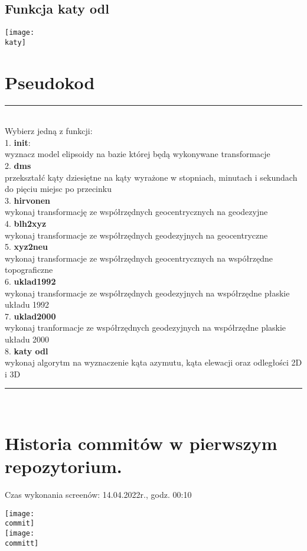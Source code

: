 \documentclass[10pt,a4paper]{article}
\begin{document}
	\subsection{Funkcja katy odl}
	\begin{center}
		\newcommand{\katy}{settings/katy.png}
		\texttt{[image: \\katy]}
	\end{center}
	
	\newpage
	\section{Pseudokod}
	\rule{\textwidth}{.5pt} \\
	Wybierz jedną z funkcji: \\
	1. \textbf{init}: \\
	wyznacz model elipsoidy na bazie której będą wykonywane transformacje \\
	2. \textbf{dms} \\
	przekształć kąty dziesiętne na kąty wyrażone w stopniach, minutach i sekundach do pięciu miejsc po przecinku \\
	3. \textbf{hirvonen} \\
	wykonaj transformację ze współrzędnych geocentrycznych na geodezyjne \\
	4. \textbf{blh2xyz} \\
	wykonaj transformacje ze współrzędnych geodezyjnych na geocentryczne \\
	5. \textbf{xyz2neu} \\
	wykonaj transformacje ze współrzędnych geocentrycznych na współrzędne topograficzne \\
	6. \textbf{uklad1992} \\
	wykonaj transformacje ze współrzędnych geodezyjnych na współrzędne płaskie układu 1992 \\
	7. \textbf{uklad2000} \\
	wykonaj tranformacje ze współrzędnych geodezyjnych na współrzędne plaskie układu 2000 \\
	8. \textbf{katy odl} \\
	wykonaj algorytm na wyznaczenie kąta azymutu, kąta elewacji oraz odległości 2D i 3D \\
	\rule{\textwidth}{.5pt} \\
	\newpage
	
	\section{Historia commitów w pierwszym repozytorium.}
	Czas wykonania screenów: 14.04.2022r., godz. 00:10
	\begin{center}
		\newcommand{\commit}{settings/commits2.png}
		\texttt{[image: \\commit]}
		\\
		\newcommand{\committ}{settings/commits1.png}
		\texttt{[image: \\committ]}
	\end{center}
	
\end{document}
